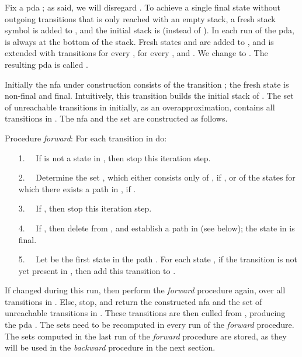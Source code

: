 \documentclass{llncs}
\begin{document}
Fix a pda ; as said, we will disregard .
To achieve a single final state without outgoing transitions that is only reached with an empty stack, a fresh stack symbol 
is added to , and the initial stack is  (instead of ). In each run of the pda,  is always at the bottom of the stack.
Fresh states  and  are added to , and  is extended with transitions  for every ,
 for every , and .
We change  to . The resulting pda is called .

Initially the nfa  under construction consists of the transition ;
the fresh state  is non-final and  final. Intuitively, this transition builds the initial stack of .
The set  of unreachable transitions in  initially, as an overapproximation, contains all transitions in .
The nfa  and the set  are constructed as follows.

\vspace{1.5mm}

\noindent
Procedure {\em forward}: For each transition  in  do:
\begin{enumerate}
\item[1.~~]
If  is not a state in , then stop this iteration step.\vspace{1mm}
\item[2.~~]
Determine the set , which either consists only of , if , or of the states  for which
there exists a path  in , if .\vspace{1mm}
\item[3.~~]
If , then stop this iteration step.
\item[4.~~]
If , then delete  from , and establish a path  in  (see below); the state  in  is final.\vspace{1mm}
\item[5.~~]
Let  be the first state in the path . For each state , if the transition 
is not yet present in , then add this transition to .
\end{enumerate}

\vspace{1mm}

\noindent
If  changed during this run, then perform the {\em forward} procedure again, over all transitions in .
Else, stop, and return the constructed nfa  and the set  of unreachable transitions in .
These transitions are then culled from , producing the pda .
The sets  need to be recomputed in every run of the {\em forward} procedure.
The sets  computed in the last run of the {\em forward} procedure are stored,
as they will be used in the {\em backward} procedure in the next section.
\end{document}
